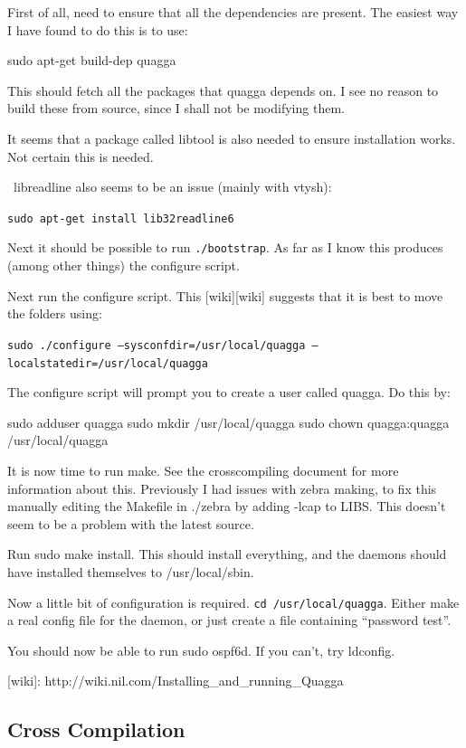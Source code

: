 First of all, need to ensure that all the dependencies are present. The easiest
way I have found to do this is to use:

sudo apt-get build-dep quagga

This should fetch all the packages that quagga depends on. I see no reason to
build these from source, since I shall not be modifying them.

It seems that a package called libtool is also needed to ensure installation works.
Not certain this is needed.

\ libreadline also seems to be an issue (mainly with vtysh):

\texttt{sudo apt-get install lib32readline6}

Next it should be possible to run \texttt{\@./bootstrap}. As far as I know this
produces (among other things) the configure script.

Next run the configure script. This [wiki][wiki] suggests that it is best to
move the folders using:

\texttt{sudo \@./configure --sysconfdir=/usr/local/quagga --localstatedir=/usr/local/quagga}

The configure script will prompt you to create a user called quagga. Do this by:

sudo adduser quagga
sudo mkdir /usr/local/quagga
sudo chown quagga:quagga /usr/local/quagga

It is now time to run make. See the crosscompiling document for more
information about this. Previously I had issues with zebra making, to fix this
manually editing the Makefile in \@./zebra by adding -lcap to LIBS\@. This doesn't
seem to be a problem with the latest source.

Run sudo make install. This should install everything, and the daemons
should have installed themselves to /usr/local/sbin.

Now a little bit of configuration is required. \texttt{cd /usr/local/quagga}.
Either make a real config file for the daemon, or just create a file containing ``password test''.


You should now be able to run sudo ospf6d. If you can't, try ldconfig.


[wiki]: http://wiki.nil.com/Installing\_and\_running\_Quagga

\subsection{Cross Compilation}

